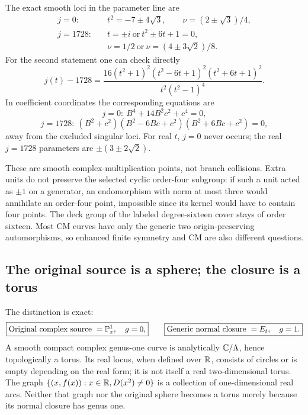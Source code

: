 The exact smooth loci in the parameter line are
\begin{align*}
j=0:&\quad t^2=-7\pm4\sqrt3,
\qquad\nu=(2\pm\sqrt3)/4,\\
j=1728:&\quad t=\pm i\ \text{or}\ t^2\pm6t+1=0,\\
&\quad\nu=1/2\ \text{or}\ \nu=(4\pm3\sqrt2)/8.
\end{align*}
For the second statement one can check directly
\[
j(t)-1728=
\frac{16(t^2+1)^2(t^2-6t+1)^2(t^2+6t+1)^2}{t^2(t^2-1)^4}.
\]
In coefficient coordinates the corresponding equations are
\[
j=0:\ B^4+14B^2c^2+c^4=0,
\]
\[
j=1728:\ (B^2+c^2)(B^2-6Bc+c^2)(B^2+6Bc+c^2)=0,
\]
away from the excluded singular loci. For real \(t\), \(j=0\) never occurs; the real \(j=1728\) parameters are \(\pm(3\pm2\sqrt2)\).

These are smooth complex-multiplication points, not branch collisions. Extra units do not preserve the selected cyclic order-four subgroup: if such a unit acted as \(\pm1\) on a generator, an endomorphism with norm at most three would annihilate an order-four point, impossible since its kernel would have to contain four points. The deck group of the labeled degree-sixteen cover stays of order sixteen. Most CM curves have only the generic two origin-preserving automorphisms, so enhanced finite symmetry and CM are also different questions.

\subsection{The original source is a sphere; the closure is a torus}
The distinction is exact:
\begin{equation}\label{eq:spheretorus}
\boxed{\text{Original complex source }=\mathbb P^1_x,\quad g=0,}
\qquad
\boxed{\text{Generic normal closure }=E_t,\quad g=1.}
\end{equation}
A smooth compact complex genus-one curve is analytically \(\mathbb C/\Lambda\), hence topologically a torus. Its real locus, when defined over \(\mathbb R\), consists of circles or is empty depending on the real form; it is not itself a real two-dimensional torus. The graph \(\{(x,f(x)):x\in\mathbb R, D(x^2)\ne0\}\) is a collection of one-dimensional real arcs. Neither that graph nor the original sphere becomes a torus merely because its normal closure has genus one.


